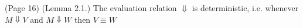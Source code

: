 (Page 16) (Lemma 2.1.) The evaluation relation $\Downarrow$ is deterministic, i.e. whenever $M \Downarrow V$ and $M \Downarrow W$ then $V \equiv W$